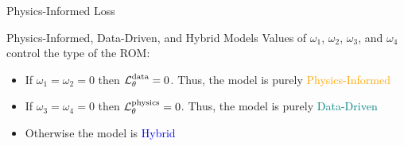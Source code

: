 \documentclass[8pt]{beamer}
\begin{document}
\begin{frame}{Physics-Informed Loss}
\end{frame}

\begin{frame}{Physics-Informed, Data-Driven, and Hybrid Models}
	Values of $\omega_1$, $\omega_2$, $\omega_3$, and $\omega_4$ control the type of the ROM:
	\begin{itemize}
		\item If $\omega_1 = \omega_2 = 0$ then $\operatorname{\mathcal{L}}_\theta^\text{data} = 0$. Thus, the model is purely \textcolor{orange}{Physics-Informed}
		\item If $\omega_3 = \omega_4 = 0$ then $\operatorname{\mathcal{L}}_\theta^\text{physics} = 0$. Thus, the model is purely \textcolor{teal}{Data-Driven}
		\item Otherwise the model is \textcolor{blue}{Hybrid}
	\end{itemize}
\end{frame}
\end{document}
